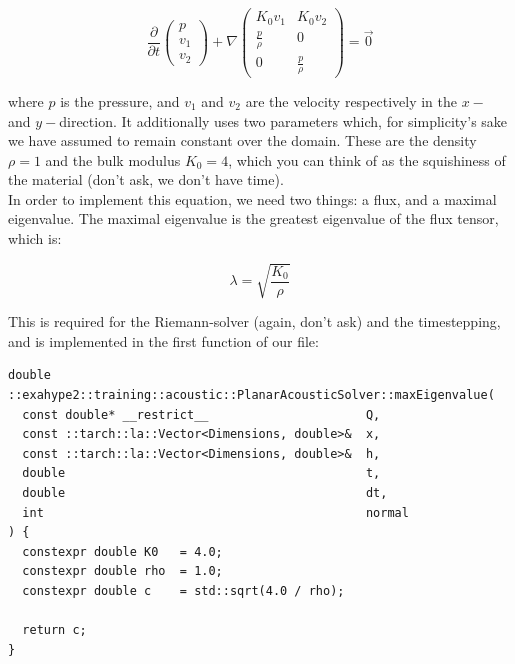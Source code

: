 \documentclass[12pt,letterpaper]{article}
\begin{document}
\begin{equation*} \label{Acoustic_equation}
    \frac{\partial}{\partial t}\left(
    \begin{array}{lr} p \\
                      v_1 \\
                      v_2
                      \end{array} \right) +
    \nabla \begin{pmatrix}
                      K_0 v_1          & K_0 v_2\\
                      \frac{p}{\rho}   & 0 \\
                      0                & \frac{p}{\rho}
    \end{pmatrix}  = \vec{0}
\end{equation*}

where $p$ is the pressure, and $v_1$ and $v_2$ are the velocity respectively in the $x-$ and $y-$direction.
It additionally uses two parameters which, for simplicity's sake we have assumed to remain constant over the domain.
These are the density $\rho=1$ and the bulk modulus $K_0=4$, which you can think of as the squishiness of the material (don't ask, we don't have time).\\
In order to implement this equation, we need two things: a flux, and a maximal eigenvalue.
The maximal eigenvalue is the greatest eigenvalue of the flux tensor, which is:

\begin{equation*} \label{Acoustic_eigenvalue}
    \lambda = \sqrt{\frac{K_0}{\rho}}
\end{equation*}

This is required for the Riemann-solver (again, don't ask) and the timestepping, and is implemented in the first function of our file:\\

\begin{lstlisting}[style = C++]
double ::exahype2::training::acoustic::PlanarAcousticSolver::maxEigenvalue(
  const double* __restrict__                      Q,
  const ::tarch::la::Vector<Dimensions, double>&  x,
  const ::tarch::la::Vector<Dimensions, double>&  h,
  double                                          t,
  double                                          dt,
  int                                             normal
) {
  constexpr double K0   = 4.0;
  constexpr double rho  = 1.0;
  constexpr double c    = std::sqrt(4.0 / rho);

  return c;
}
\end{lstlisting}
\end{document}
